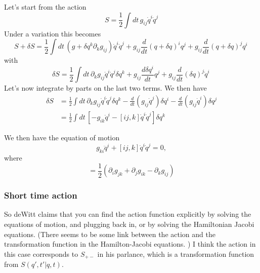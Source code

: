 Let's start from the action
\begin{equation}
S = \frac{1}{2}\int dt\, g_{ij}\dot{q}^i\dot{q}^j
\end{equation}
Under a variation this becomes 
\begin{equation}
S+\delta S = \frac{1}{2}\int dt\, (g+\delta q^k\partial_kg_{ij})\dot{q}^i\dot{q}^j+ g_{ij}\frac{d}{dt}(q+\delta q)^iq^j + g_{ij}\frac{d}{dt}(q+\delta q)^jq^i\,
\end{equation}
with 
\begin{equation}
\delta S   = \frac{1}{2}\int dt\, \partial_kg_{ij}\dot{q}^i\dot{q}^j\delta q^k + g_{ij}\frac{d\delta q^i}{dt}q^j + g_{ij}\frac{d}{dt}(\delta q)^j\dot{q}^i\,
\end{equation}
Let's now integrate by parts on the last two terms.  We then have
\begin{align}
\delta S & = \frac{1}{2}\int dt\, \partial_kg_{ij}\dot{q}^i\dot{q}^j\delta q^k - \frac{d}{dt}(g_{ij}\dot{q}^j)\delta q^i - \frac{d}{dt}(g_{ij}\dot{q}^i)\delta q^j\\
& = \frac{1}{2}\int dt\, \left[-g_{ik}\ddot{q}^i - [ij,k]\dot{q}^i \dot{q}^j\right]\delta q^k
\end{align}

We then have the equation of motion
\begin{equation}
g_{ki}\ddot{q}^i  + [ij,k]\dot{q}^i\dot{q}^j= 0,\label{eq:eqn_of_motion}
\end{equation}
where 
\begin{equation}
[ij,k] = \frac{1}{2}(\partial_ig_{jk} + \partial_jg_{ik} - \partial_k g_{ij})
\end{equation}

\subsubsection{Short time action}

So deWitt claims that you can find the action function explicitly by solving the equations of motion, and plugging back in, or by solving the Hamiltonian Jacobi equations.  (There seems to be some link between the action and the transformation function in the Hamilton-Jacobi equations.  ) I think the action in this case corresponds to $S_{+-}$ in his parlance, which is a transformation function from $S(q',t'|q,t)$.  

